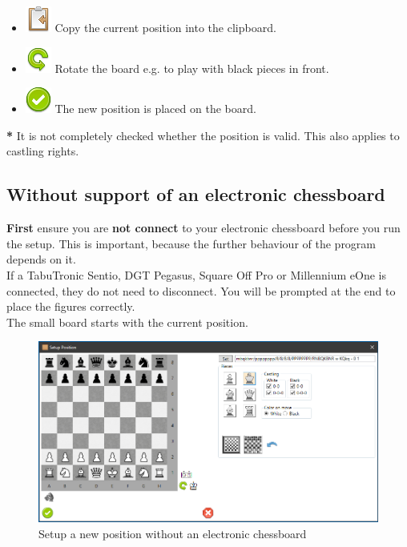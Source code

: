 \documentclass[11pt,a4paper]{article}
\begin{document}
\begin{itemize}
	\item \includegraphics[scale=0.5]{clipboard_sign_out.png} Copy the current position into the clipboard.
	\item \includegraphics[scale=0.5]{arrow_rotate_anticlockwise.png} Rotate the board e.g. to play with black pieces in front.
	\item \includegraphics[scale=0.5]{accept_button.png} The new position is placed on the board.
\end{itemize}

\textbf{{\color{red}*}} It is not completely checked whether the position is valid. This also applies to castling rights.

\subsection{Without support of an electronic chessboard}

\textbf{First} ensure you are \textbf{not connect} to your electronic chessboard before you run the setup. This is important, because the further behaviour of the program depends on it.\\
If a TabuTronic Sentio, DGT Pegasus, Square Off Pro or Millennium eOne is connected, they do not need to disconnect. You will be prompted at the end to place the figures correctly. \\
The small board starts with the current position.

\begin{figure}[H]
	\centering
	\includegraphics[scale=0.5]{SetupPosition2.png}
	\caption{Setup a new position without an electronic chessboard}
	\label{fig:SetupPosition2}
\end{figure}
\end{document}
